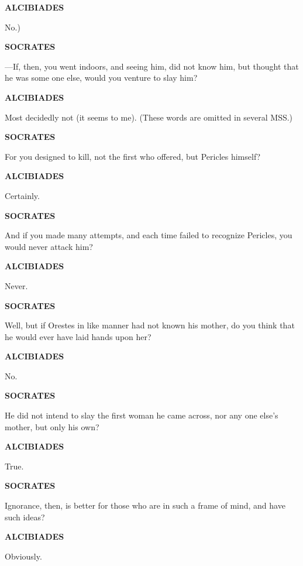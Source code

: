\documentclass[11pt,letter]{article}
\begin{document}
\par \textbf{ALCIBIADES}
\par   No.)

\par \textbf{SOCRATES}
\par  —If, then, you went indoors, and seeing him, did not know him, but thought that he was some one else, would you venture to slay him?

\par \textbf{ALCIBIADES}
\par   Most decidedly not (it seems to me). (These words are omitted in several MSS.)

\par \textbf{SOCRATES}
\par   For you designed to kill, not the first who offered, but Pericles himself?

\par \textbf{ALCIBIADES}
\par   Certainly.

\par \textbf{SOCRATES}
\par   And if you made many attempts, and each time failed to recognize Pericles, you would never attack him?

\par \textbf{ALCIBIADES}
\par   Never.

\par \textbf{SOCRATES}
\par   Well, but if Orestes in like manner had not known his mother, do you think that he would ever have laid hands upon her?

\par \textbf{ALCIBIADES}
\par   No.

\par \textbf{SOCRATES}
\par   He did not intend to slay the first woman he came across, nor any one else's mother, but only his own?

\par \textbf{ALCIBIADES}
\par   True.

\par \textbf{SOCRATES}
\par   Ignorance, then, is better for those who are in such a frame of mind, and have such ideas?

\par \textbf{ALCIBIADES}
\par   Obviously.
\end{document}

